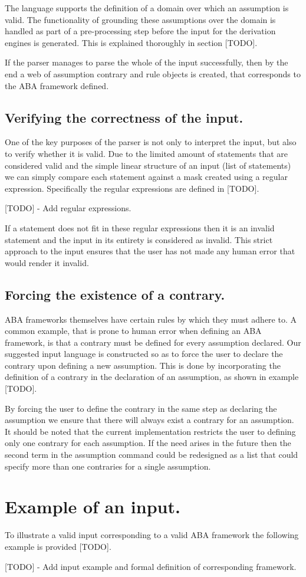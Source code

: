 The language supports the definition of a domain over which an assumption is valid. The functionality of grounding these assumptions over the domain is handled as part of a pre-processing step before the input for the derivation engines is generated. This is explained thoroughly in section [TODO].

If the parser manages to parse the whole of the input successfully, then by the end a web of assumption contrary and rule objects is created, that corresponds to the ABA framework defined.

\subsection{Verifying the correctness of the input.}

One of the key purposes of the parser is not only to interpret the input, but also to verify whether it is valid. Due to the limited amount of statements that are considered valid and the simple linear structure of an input (list of statements) we can simply compare each statement against a mask created using a regular expression. Specifically the regular expressions are defined in [TODO].

[TODO] - Add regular expressions.

If a statement does not fit in these regular expressions then it is an invalid statement and the input in its entirety is considered as invalid. This strict approach to the input ensures that the user has not made any human error that would render it invalid.

\subsection{Forcing the existence of a contrary.}

ABA frameworks themselves have certain rules by which they must adhere to. A common example, that is prone to human error when defining an ABA framework, is that a contrary must be defined for every assumption declared. Our suggested input language is constructed so as to force the user to declare the contrary upon defining a new assumption. This is done by incorporating the definition of a contrary in the declaration of an assumption, as shown in example [TODO].

By forcing the user to define the contrary in the same step as declaring the assumption we ensure that there will always exist a contrary for an assumption. It should be noted that the current implementation restricts the user to defining only one contrary for each assumption. If the need arises in the future then the second term in the assumption command could be redesigned as a list that could specify more than one contraries for a single assumption.

\section{Example of an input.}

To illustrate a valid input corresponding to a valid ABA framework the following example is provided [TODO].

[TODO] - Add input example and formal definition of corresponding framework.